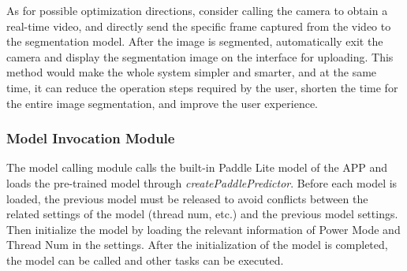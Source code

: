 
As for possible optimization directions, consider calling the camera to obtain a real-time video, and directly send the specific frame captured from the video to the segmentation model. After the image is segmented, automatically exit the camera and display the segmentation image on the interface for uploading. This method would make the whole system simpler and smarter, and at the same time, it can reduce the operation steps required by the user, shorten the time for the entire image segmentation, and improve the user experience.

\subsubsection{Model Invocation Module}

The model calling module calls the built-in Paddle Lite model of the APP and loads the pre-trained model through \textit{createPaddlePredictor}. Before each model is loaded, the previous model must be released to avoid conflicts between the related settings of the model (thread num, etc.) and the previous model settings. Then initialize the model by loading the relevant information of Power Mode and Thread Num in the settings. After the initialization of the model is completed, the model can be called and other tasks can be executed.


